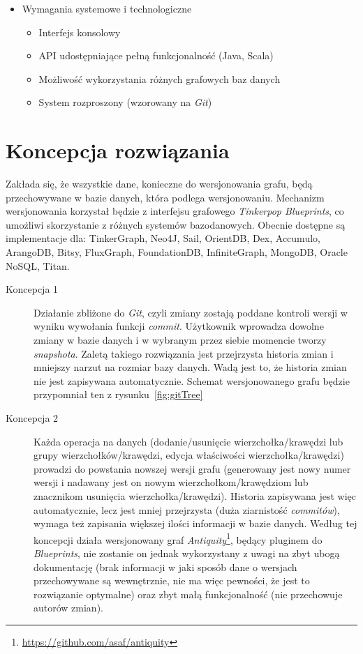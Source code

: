 \begin{itemize}
\renewcommand{\labelitemi}{$\bullet$}
\renewcommand{\labelitemii}{$\bullet$}
  \item Wymagania systemowe i technologiczne
  \begin{itemize}
     \item Interfejs konsolowy
     \item API  udostępniające pełną funkcjonalność (Java, Scala)
     \item Możliwość wykorzystania różnych grafowych baz danych
     \item System rozproszony (wzorowany na \emph{Git})
  \end{itemize}
\end{itemize}




\section{Koncepcja rozwiązania}
\label{sec:koncepcjaRozwiazania}

Zakłada się, że wszystkie dane, konieczne do wersjonowania grafu, będą przechowywane w bazie danych, która podlega wersjonowaniu. Mechanizm wersjonowania korzystał będzie z interfejsu grafowego \emph{Tinkerpop Blueprints}, co umożliwi skorzystanie z różnych systemów bazodanowych. Obecnie dostępne są implementacje dla: TinkerGraph, Neo4J, Sail, OrientDB, Dex, Accumulo, ArangoDB, Bitsy, FluxGraph, FoundationDB, InfiniteGraph, MongoDB, Oracle NoSQL, Titan.

\begin{description}
\item[Koncepcja 1] Działanie zbliżone do \emph{Git}, czyli zmiany zostają poddane kontroli wersji w wyniku wywołania funkcji \emph{commit}. Użytkownik wprowadza dowolne zmiany w bazie danych i w wybranym przez siebie momencie tworzy \emph{snapshota}. Zaletą takiego rozwiązania jest przejrzysta historia zmian i mniejszy narzut na rozmiar bazy danych. Wadą jest to, że historia zmian nie jest zapisywana automatycznie. Schemat wersjonowanego grafu będzie przypomniał ten z rysunku~\ref{fig:gitTree}
\item[Koncepcja 2] Każda operacja na danych (dodanie/usunięcie wierzchołka/krawędzi lub grupy wierzchołków/krawędzi, edycja właściwości wierzchołka/krawędzi) prowadzi do powstania nowszej wersji grafu (generowany jest nowy numer wersji i nadawany jest on nowym wierzchołkom/krawędziom lub znacznikom usunięcia wierzchołka/krawędzi). Historia zapisywana jest więc automatycznie, lecz jest mniej przejrzysta (duża ziarnistość \emph{commitów}), wymaga też zapisania większej ilości informacji w bazie danych. Według tej koncepcji działa wersjonowany graf \emph{Antiquity}\footnote{\url{https://github.com/asaf/antiquity}}, będący pluginem do \emph{Blueprints}, nie zostanie on jednak wykorzystany z uwagi na zbyt ubogą dokumentację (brak informacji w jaki sposób dane o wersjach przechowywane są wewnętrznie, nie ma więc pewności, że jest to rozwiązanie optymalne) oraz zbyt małą funkcjonalność (nie przechowuje autorów zmian).
\end{description}
